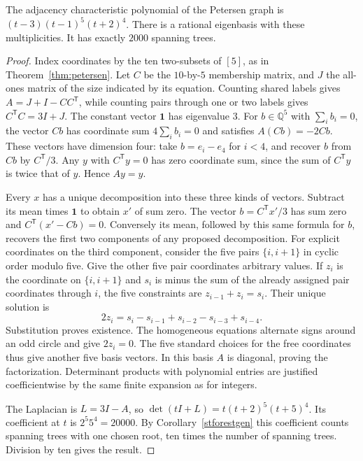\begin{theorem}\leavevmode\label{spec:petersen}
The adjacency characteristic polynomial of the Petersen graph is $(t-3)(t-1)^5(t+2)^4$. There is a rational eigenbasis with these multiplicities. It has exactly $2000$ spanning trees.
\end{theorem}
\begin{proof}
Index coordinates by the ten two-subsets of $[5]$, as in Theorem~\ref{thm:petersen}. Let $C$ be the $10$-by-$5$ membership matrix, and $J$ the all-ones matrix of the size indicated by its equation. Counting shared labels gives $A=J+I-CC^{\mathsf T}$, while counting pairs through one or two labels gives $C^{\mathsf T}C=3I+J$. The constant vector $\mathbf 1$ has eigenvalue $3$. For $b\in\mathbb Q^5$ with $\sum_i b_i=0$, the vector $Cb$ has coordinate sum $4\sum_i b_i=0$ and satisfies $A(Cb)=-2Cb$. These vectors have dimension four: take $b=e_i-e_4$ for $i<4$, and recover $b$ from $Cb$ by $C^{\mathsf T}/3$. Any $y$ with $C^{\mathsf T}y=0$ has zero coordinate sum, since the sum of $C^{\mathsf T}y$ is twice that of $y$. Hence $Ay=y$.

Every $x$ has a unique decomposition into these three kinds of vectors. Subtract its mean times $\mathbf1$ to obtain $x'$ of sum zero. The vector $b=C^{\mathsf T}x'/3$ has sum zero and $C^{\mathsf T}(x'-Cb)=0$. Conversely its mean, followed by this same formula for $b$, recovers the first two components of any proposed decomposition. For explicit coordinates on the third component, consider the five pairs $\{i,i+1\}$ in cyclic order modulo five. Give the other five pair coordinates arbitrary values. If $z_i$ is the coordinate on $\{i,i+1\}$ and $s_i$ is minus the sum of the already assigned pair coordinates through $i$, the five constraints are $z_{i-1}+z_i=s_i$. Their unique solution is
\[
 2z_i=s_i-s_{i-1}+s_{i-2}-s_{i-3}+s_{i-4}.
\]
Substitution proves existence. The homogeneous equations alternate signs around an odd circle and give $2z_i=0$. The five standard choices for the free coordinates thus give another five basis vectors. In this basis $A$ is diagonal, proving the factorization. Determinant products with polynomial entries are justified coefficientwise by the same finite expansion as for integers.

The Laplacian is $L=3I-A$, so $\det(tI+L)=t(t+2)^5(t+5)^4$. Its coefficient at $t$ is $2^5 5^4=20000$. By Corollary~\ref{stforestgen} this coefficient counts spanning trees with one chosen root, ten times the number of spanning trees. Division by ten gives the result.
\end{proof}
